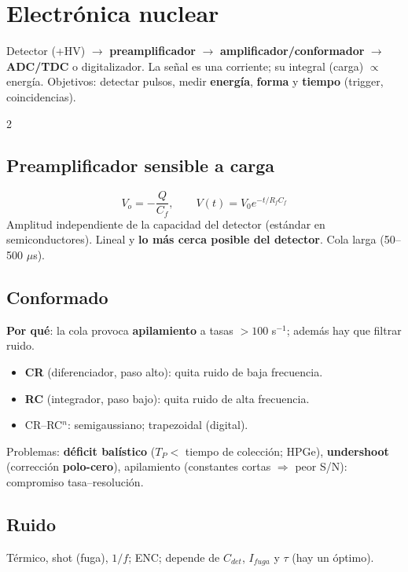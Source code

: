 \documentclass[10pt,a4paper]{article}
\begin{document}
\setcounter{section}{6}
\section{Electrónica nuclear}
\begin{clave}[Cadena]
Detector (+HV) $\to$ \textbf{preamplificador} $\to$ \textbf{amplificador/conformador} $\to$ \textbf{ADC/TDC} o digitalizador. La señal es una corriente; su integral (carga) $\propto$ energía.
Objetivos: detectar pulsos, medir \textbf{energía}, \textbf{forma} y \textbf{tiempo} (trigger, coincidencias).
\end{clave}
\begin{multicols}{2}
\subsection{Preamplificador sensible a carga}
\[ V_o=-\frac{Q}{C_f},\qquad V(t)=V_0e^{-t/R_fC_f} \]
Amplitud independiente de la capacidad del detector (estándar en semiconductores). Lineal y \textbf{lo más cerca posible del detector}. Cola larga (50--500 $\mu$s).
\subsection{Conformado}
\textbf{Por qué}: la cola provoca \textbf{apilamiento} a tasas $>100$ s$^{-1}$; además hay que filtrar ruido.
\begin{itemize}
\item \textbf{CR} (diferenciador, paso alto): quita ruido de baja frecuencia.
\item \textbf{RC} (integrador, paso bajo): quita ruido de alta frecuencia.
\item CR--RC$^n$: semigaussiano; trapezoidal (digital).
\end{itemize}
Problemas: \textbf{déficit balístico} ($T_P<$ tiempo de colección; HPGe), \textbf{undershoot} (corrección \textbf{polo-cero}), apilamiento (constantes cortas $\Rightarrow$ peor S/N): compromiso tasa--resolución.
\subsection{Ruido}
Térmico, shot (fuga), $1/f$; ENC; depende de $C_{det}$, $I_{fuga}$ y $\tau$ (hay un óptimo).

\end{multicols}
\end{document}
